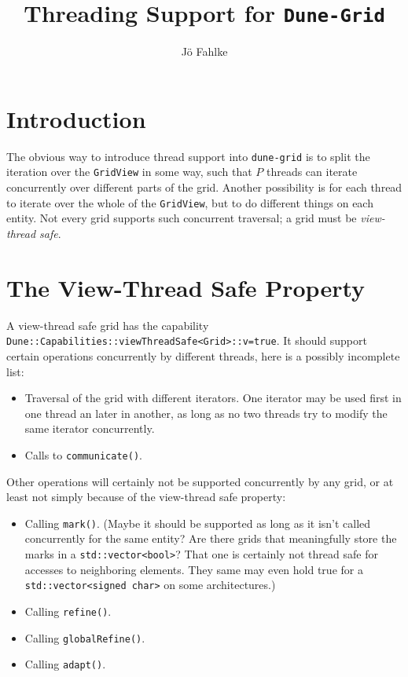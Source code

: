\documentclass{article}
\newcommand\grid{{\tt dune-grid}\xspace}
\newcommand\GRid{{\tt Dune-Grid}\xspace}
\begin{document}
\title{Threading Support for \GRid}

\author{Jö Fahlke}

\maketitle

\tableofcontents

\section{Introduction}

The obvious way to introduce thread support into \grid is to split the
iteration over the {\tt GridView} in some way, such that $P$ threads can
iterate concurrently over different parts of the grid.  Another possibility is
for each thread to iterate over the whole of the {\tt GridView}, but to do
different things on each entity.  Not every grid supports such concurrent
traversal; a grid must be {\em view-thread safe}.

\section{The View-Thread Safe Property}

A view-thread safe grid has the capability {\tt
  Dune::Capabilities::viewThreadSafe<Grid>::v=true}.  It should support
certain operations concurrently by different threads, here is a possibly
incomplete list:
\begin{itemize}
\item Traversal of the grid with different iterators.  One iterator may be
  used first in one thread an later in another, as long as no two threads try
  to modify the same iterator concurrently.
\item Calls to {\tt communicate()}.
\end{itemize}
Other operations will certainly not be supported concurrently by any grid, or
at least not simply because of the view-thread safe property:
\begin{itemize}
\item Calling {\tt mark()}.  (Maybe it should be supported as long as it isn't
  called concurrently for the same entity?  Are there grids that meaningfully
  store the marks in a {\tt std::vector<bool>}?  That one is certainly not
  thread safe for accesses to neighboring elements.  They same may even hold
  true for a {\tt std::vector<signed char>} on some architectures.)
\item Calling {\tt refine()}.
\item Calling {\tt globalRefine()}.
\item Calling {\tt adapt()}.
\end{itemize}
\end{document}
